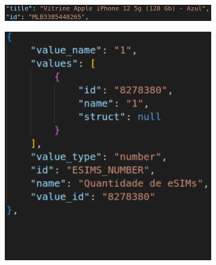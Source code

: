\begin{figure}
    \begin{subfigure}{\linewidth}
        \includegraphics[width=\linewidth]{figuras/api-cabecalho.png}
        \caption{}
        \label{fig:header}
    \end{subfigure}
    
    \begin{subfigure}{0.33\linewidth}
        \includegraphics[width=\linewidth]{figuras/api-atributo2.png}
        \caption{}
        \label{fig:display_size}
    \end{subfigure}%
    \begin{subfigure}{0.33\linewidth}

\end{subfigure}
\end{figure}
